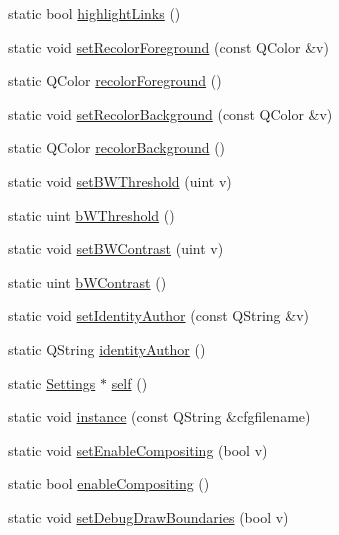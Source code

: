 \begin{DoxyCompactItemize}
\item 
static bool \hyperlink{classOkular_1_1Settings_ae49aa56e379f78d0295ce2afddfa7763}{highlight\+Links} ()
\item 
static void \hyperlink{classOkular_1_1Settings_aaa868e6f498c3fad51efde74c00d8f98}{set\+Recolor\+Foreground} (const Q\+Color \&v)
\item 
static Q\+Color \hyperlink{classOkular_1_1Settings_ad2fa94bea1f5cd63394fb0eb43515f72}{recolor\+Foreground} ()
\item 
static void \hyperlink{classOkular_1_1Settings_a1cb12f4cd1b386dddabd1956270ed040}{set\+Recolor\+Background} (const Q\+Color \&v)
\item 
static Q\+Color \hyperlink{classOkular_1_1Settings_a3b5300e5e203a1d4e9d08b2edfe4f152}{recolor\+Background} ()
\item 
static void \hyperlink{classOkular_1_1Settings_ab2aa2d76c7c8ea38b51984feae09548e}{set\+B\+W\+Threshold} (uint v)
\item 
static uint \hyperlink{classOkular_1_1Settings_a5246ad88486cd24b99606fcb063aa269}{b\+W\+Threshold} ()
\item 
static void \hyperlink{classOkular_1_1Settings_a95f5a95baf16de59556f2cb9c50a8ebf}{set\+B\+W\+Contrast} (uint v)
\item 
static uint \hyperlink{classOkular_1_1Settings_a3f705adb7a04efb41f5f6acd6ef3bab9}{b\+W\+Contrast} ()
\item 
static void \hyperlink{classOkular_1_1Settings_a1e5fec07476b355de67745888a5bbb1d}{set\+Identity\+Author} (const Q\+String \&v)
\item 
static Q\+String \hyperlink{classOkular_1_1Settings_ae643409dda70c22852664fa4677896a1}{identity\+Author} ()
\item 
static \hyperlink{classOkular_1_1Settings}{Settings} $\ast$ \hyperlink{classOkular_1_1Settings_abf22741012c899947f224f757a7f4a72}{self} ()
\item 
static void \hyperlink{classOkular_1_1Settings_a7004e22ba08299ebc35aa8547c8d41c8}{instance} (const Q\+String \&cfgfilename)
\item 
static void \hyperlink{classOkular_1_1Settings_a05ddae35c9ff05abbaec61e9e07df0f0}{set\+Enable\+Compositing} (bool v)
\item 
static bool \hyperlink{classOkular_1_1Settings_a3653ce9be5655bc3f9f8d158542f33bd}{enable\+Compositing} ()
\item 
static void \hyperlink{classOkular_1_1Settings_a42f7df98bac2c05b70959826f40605ae}{set\+Debug\+Draw\+Boundaries} (bool v)

\end{DoxyCompactItemize}
